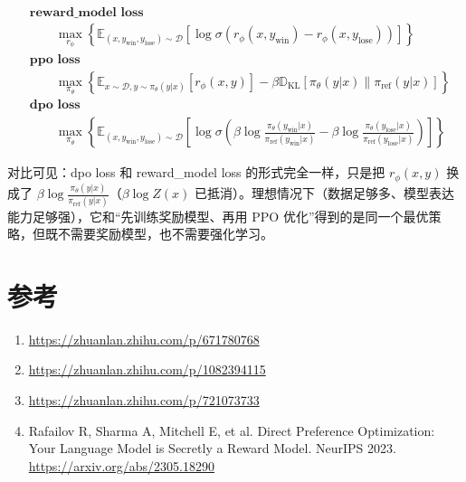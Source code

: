 \documentclass[UTF8,fontset=fandol]{ctexart}
\begin{document}
\begin{align*}
&\textbf{reward\_model loss} \\
&\qquad \max_{r_\phi} \left\{ \mathbb{E}_{(x, y_{\text{win}}, y_{\text{lose}}) \sim \mathcal{D}} \left[ \log \sigma (r_\phi(x, y_{\text{win}}) - r_\phi(x, y_{\text{lose}})) \right] \right\} \\[15pt]
&\textbf{ppo loss} \\
&\qquad \max_{\pi_\theta} \left\{ \mathbb{E}_{x \sim \mathcal{D}, y \sim \pi_\theta(y|x)} \left[ r_\phi(x, y) \right] - \beta \mathbb{D}_{\mathrm{KL}} \left[ \pi_\theta(y|x) \parallel \pi_{\text{ref}}(y|x) \right] \right\} \\[15pt]
&\textbf{dpo loss} \\
&\qquad \max_{\pi_\theta} \left\{ \mathbb{E}_{(x, y_{\text{win}}, y_{\text{lose}}) \sim \mathcal{D}} \left[ \log \sigma \left( \beta \log \frac{\pi_\theta(y_{\text{win}}|x)}{\pi_{\text{ref}}(y_{\text{win}}|x)} - \beta \log \frac{\pi_\theta(y_{\text{lose}}|x)}{\pi_{\text{ref}}(y_{\text{lose}}|x)} \right) \right] \right\}
\end{align*}

对比可见：dpo loss 和 reward\_model loss 的形式完全一样，只是把 \(r_\phi(x, y)\) 换成了 \(\beta \log \frac{\pi_\theta(y|x)}{\pi_{\text{ref}}(y|x)}\)（\(\beta \log Z(x)\) 已抵消）。理想情况下（数据足够多、模型表达能力足够强），它和“先训练奖励模型、再用 PPO 优化”得到的是同一个最优策略，但既不需要奖励模型，也不需要强化学习。

\section{参考}

\begin{enumerate}
\item \url{https://zhuanlan.zhihu.com/p/671780768}
\item \url{https://zhuanlan.zhihu.com/p/1082394115}
\item \url{https://zhuanlan.zhihu.com/p/721073733}
\item Rafailov R, Sharma A, Mitchell E, et al. Direct Preference Optimization: Your Language Model is Secretly a Reward Model. NeurIPS 2023. \url{https://arxiv.org/abs/2305.18290}
\end{enumerate}
\end{document}
